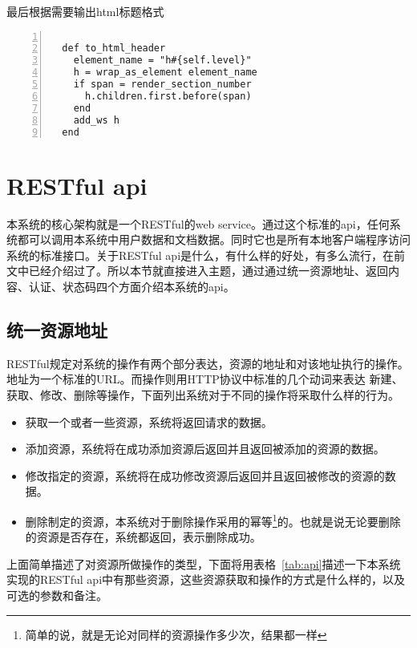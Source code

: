 最后根据需要输出html标题格式

\begin{lstlisting}[language={[ANSI]C}, numbers=left, numberstyle=\tiny, keywordstyle=\color{blue!70}, commentstyle=\color{red!50!green!50!blue!50}, rulesepcolor=\color{red!20!green!20!blue!20}]

  def to_html_header
    element_name = "h#{self.level}"
    h = wrap_as_element element_name
    if span = render_section_number
      h.children.first.before(span)
    end
    add_ws h
  end

\end{lstlisting}

\section{RESTful api}
\label{sec:apitable}

本系统的核心架构就是一个RESTful的web service。通过这个标准的api，任何系统都可以调用本系统中用户数据和文档数据。同时它也是所有本地客户端程序访问系统的标准接口。关于RESTful api是什么，有什么样的好处，有多么流行，在前文中已经介绍过了。所以本节就直接进入主题，通过通过统一资源地址、返回内容、认证、状态码四个方面介绍本系统的api。
\subsection{统一资源地址}
\label{sec:researchurl}
RESTful规定对系统的操作有两个部分表达，资源的地址和对该地址执行的操作。地址为一个标准的URL。而操作则用HTTP协议中标准的几个动词来表达 新建、获取、修改、删除等操作，下面列出系统对于不同的操作将采取什么样的行为。
\begin{itemize}
\item {} 获取一个或者一些资源，系统将返回请求的数据。
\item {} 添加资源，系统将在成功添加资源后返回并且返回被添加的资源的数据。
\item {} 修改指定的资源，系统将在成功修改资源后返回并且返回被修改的资源的数据。
\item {} 删除制定的资源，本系统对于删除操作采用的幂等\footnote{简单的说，就是无论对同样的资源操作多少次，结果都一样}的。也就是说无论要删除的资源是否存在，系统都返回，表示删除成功。
\end{itemize}


上面简单描述了对资源所做操作的类型，下面将用表格~\ref{tab:api}描述一下本系统实现的RESTful api中有那些资源，这些资源获取和操作的方式是什么样的，以及可选的参数和备注。

